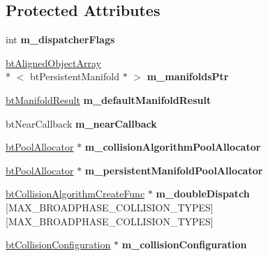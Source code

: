 \subsection*{Protected Attributes}
\begin{DoxyCompactItemize}
\item 
\hypertarget{classbt_collision_dispatcher_a114a4b35cf3ee6a07cae74af4f801055}{int {\bfseries m\+\_\+dispatcher\+Flags}}\label{classbt_collision_dispatcher_a114a4b35cf3ee6a07cae74af4f801055}

\item 
\hypertarget{classbt_collision_dispatcher_ab852dc0e25750f72b2a9a5d812ae6789}{\hyperlink{classbt_aligned_object_array}{bt\+Aligned\+Object\+Array}\\*
$<$ bt\+Persistent\+Manifold $\ast$ $>$ {\bfseries m\+\_\+manifolds\+Ptr}}\label{classbt_collision_dispatcher_ab852dc0e25750f72b2a9a5d812ae6789}

\item 
\hypertarget{classbt_collision_dispatcher_ac3c056e01165133a490b1280f5b305fa}{\hyperlink{classbt_manifold_result}{bt\+Manifold\+Result} {\bfseries m\+\_\+default\+Manifold\+Result}}\label{classbt_collision_dispatcher_ac3c056e01165133a490b1280f5b305fa}

\item 
\hypertarget{classbt_collision_dispatcher_aea09f822bcd97e30370b77f85415e279}{bt\+Near\+Callback {\bfseries m\+\_\+near\+Callback}}\label{classbt_collision_dispatcher_aea09f822bcd97e30370b77f85415e279}

\item 
\hypertarget{classbt_collision_dispatcher_a852e09f7ff0be8c0a86e3659877b5985}{\hyperlink{classbt_pool_allocator}{bt\+Pool\+Allocator} $\ast$ {\bfseries m\+\_\+collision\+Algorithm\+Pool\+Allocator}}\label{classbt_collision_dispatcher_a852e09f7ff0be8c0a86e3659877b5985}

\item 
\hypertarget{classbt_collision_dispatcher_abe281cf4ea5a5509d2b95be42ff8b04e}{\hyperlink{classbt_pool_allocator}{bt\+Pool\+Allocator} $\ast$ {\bfseries m\+\_\+persistent\+Manifold\+Pool\+Allocator}}\label{classbt_collision_dispatcher_abe281cf4ea5a5509d2b95be42ff8b04e}

\item 
\hypertarget{classbt_collision_dispatcher_a8e243d43f09dac7a512dd6443ec25642}{\hyperlink{structbt_collision_algorithm_create_func}{bt\+Collision\+Algorithm\+Create\+Func} $\ast$ {\bfseries m\+\_\+double\+Dispatch} \mbox{[}M\+A\+X\+\_\+\+B\+R\+O\+A\+D\+P\+H\+A\+S\+E\+\_\+\+C\+O\+L\+L\+I\+S\+I\+O\+N\+\_\+\+T\+Y\+P\+E\+S\mbox{]}\mbox{[}M\+A\+X\+\_\+\+B\+R\+O\+A\+D\+P\+H\+A\+S\+E\+\_\+\+C\+O\+L\+L\+I\+S\+I\+O\+N\+\_\+\+T\+Y\+P\+E\+S\mbox{]}}\label{classbt_collision_dispatcher_a8e243d43f09dac7a512dd6443ec25642}

\item 
\hypertarget{classbt_collision_dispatcher_a2185ce7f17cbed62f6157ce09114fc46}{\hyperlink{classbt_collision_configuration}{bt\+Collision\+Configuration} $\ast$ {\bfseries m\+\_\+collision\+Configuration}}\label{classbt_collision_dispatcher_a2185ce7f17cbed62f6157ce09114fc46}

\end{DoxyCompactItemize}


